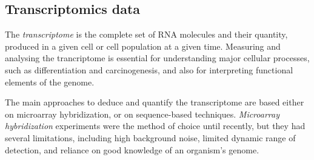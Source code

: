 \subsection{Transcriptomics data} \label{rnaSeq-data-sect}
The \emph{transcriptome} is the complete set of RNA molecules and their quantity, produced in a given cell or cell population at a given time. Measuring and analysing the trancriptome is essential for understanding major cellular processes, such as differentiation and carcinogenesis, and also for interpreting functional elements of the genome. 

The main approaches to deduce and quantify the transcriptome are based either on microarray hybridization, or on sequence-based techniques. \emph{Microarray hybridization} experiments \citep{Babu2004} were the method of choice until recently, but they had several limitations, including high background noise, limited dynamic range of detection, and reliance on good knowledge of an organism's genome. 

